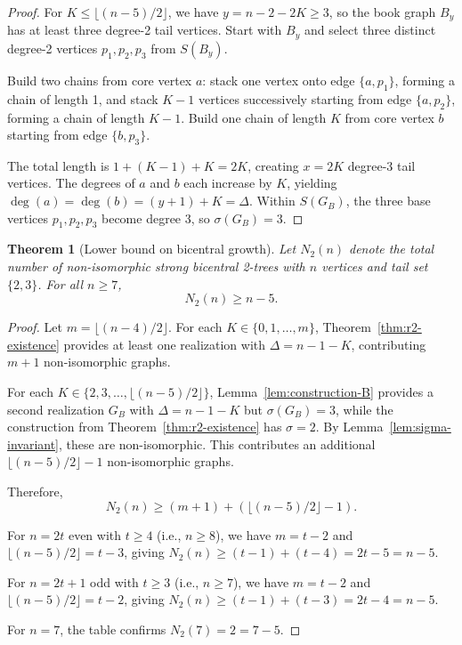 \documentclass[12pt]{article}
\newtheorem{theorem}{Theorem}[section]
\numberwithin{equation}{section}
\begin{document}
\begin{proof}
For $K \leq \lfloor(n-5)/2\rfloor$, we have $y = n-2-2K \geq 3$, so the book 
graph $B_y$ has at least three degree-2 tail vertices. Start with $B_y$ and 
select three distinct degree-2 vertices $p_1, p_2, p_3$ from $S(B_y)$.

Build two chains from core vertex $a$: stack one vertex onto edge $\{a, p_1\}$, 
forming a chain of length 1, and stack $K-1$ vertices successively starting from 
edge $\{a, p_2\}$, forming a chain of length $K-1$. Build one chain of length $K$ 
from core vertex $b$ starting from edge $\{b, p_3\}$.

The total length is $1 + (K-1) + K = 2K$, creating $x = 2K$ degree-3 tail vertices. 
The degrees of $a$ and $b$ each increase by $K$, yielding $\deg(a) = \deg(b) = 
(y+1) + K = \Delta$. Within $S(G_B)$, the three base vertices $p_1, p_2, p_3$ 
become degree 3, so $\sigma(G_B) = 3$.
\end{proof}

\begin{theorem}[Lower bound on bicentral growth]\label{thm:improved-bicentral-bound} Let $N_2(n)$ denote the total number of non-isomorphic strong bicentral 2-trees with $n$ vertices and tail set $\{2,3\}$. For all $n \geq 7$,
\[
N_2(n) \geq n - 5.
\]
\end{theorem}

\begin{proof}
Let $m = \lfloor(n-4)/2\rfloor$. For each $K \in \{0, 1, \ldots, m\}$, 
Theorem~\ref{thm:r2-existence} provides at least one realization with 
$\Delta = n-1-K$, contributing $m+1$ non-isomorphic graphs.

For each $K \in \{2, 3, \ldots, \lfloor(n-5)/2\rfloor\}$, Lemma~\ref{lem:construction-B} 
provides a second realization $G_B$ with $\Delta = n-1-K$ but $\sigma(G_B) = 3$, 
while the construction from Theorem~\ref{thm:r2-existence} has $\sigma = 2$. 
By Lemma~\ref{lem:sigma-invariant}, these are non-isomorphic. This contributes 
an additional $\lfloor(n-5)/2\rfloor - 1$ non-isomorphic graphs.

Therefore,
\[
N_2(n) \geq (m+1) + (\lfloor(n-5)/2\rfloor - 1).
\]

For $n = 2t$ even with $t \geq 4$ (i.e., $n \geq 8$), we have $m = t-2$ and 
$\lfloor(n-5)/2\rfloor = t-3$, giving $N_2(n) \geq (t-1) + (t-4) = 2t-5 = n-5$.

For $n = 2t+1$ odd with $t \geq 3$ (i.e., $n \geq 7$), we have $m = t-2$ and 
$\lfloor(n-5)/2\rfloor = t-2$, giving $N_2(n) \geq (t-1) + (t-3) = 2t-4 = n-5$.

For $n = 7$, the table confirms $N_2(7) = 2 = 7-5$.
\end{proof}
\end{document}
